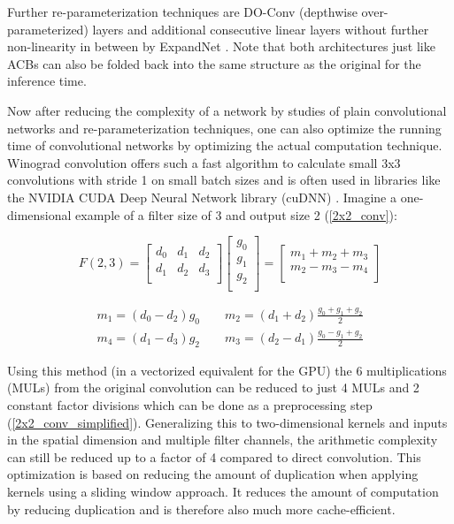 Further re-parameterization techniques are DO-Conv (depthwise over-parameterized) layers \cite{JinmingCao.2020} and additional consecutive linear layers without further non-linearity in between by ExpandNet \cite{ShuxuanGuo.2021}. Note that both architectures just like ACBs can also be folded back into the same structure as the original for the inference time. 

Now after reducing the complexity of a network by studies of plain convolutional networks and re-parameterization techniques, one can also optimize the running time of convolutional networks by optimizing the actual computation technique. Winograd convolution offers such a fast algorithm to calculate small 3x3 convolutions with stride 1 on small batch sizes and is often used in libraries like the NVIDIA CUDA Deep Neural Network library (cuDNN) \cite{SharanChetlur.2014}. Imagine a one-dimensional example of a filter size of 3 and output size 2 (\autoref{2x2_conv}):

\begin{equation} \label{2x2_conv}
	F(2,3) = \begin{bmatrix}
		d_0 & d_1 & d_2 \\
		d_1 & d_2 & d_3 \\
	\end{bmatrix} \begin{bmatrix}
		g_0 \\
		g_1 \\
		g_2 \\
	\end{bmatrix} = \begin{bmatrix}
		m_1 + m_2 + m_3 \\
		m_2 - m_3 - m_4 \\
	\end{bmatrix}
\end{equation}

\begin{equation} \label{2x2_conv_simplified}
	\begin{array}{c}
		m_1 = (d_0 - d_2) g_0 \qquad m_2 = (d_1 + d_2) \frac{g_0 + g_1 + g_2}{2} \\[6pt]
		m_4 = (d_1 - d_3) g_2 \qquad m_3 = (d_2 - d_1) \frac{g_0 - g_1 + g_2}{2}
	\end{array}
\end{equation}

Using this method (in a vectorized equivalent for the GPU) the 6 multiplications (MULs) from the original convolution can be reduced to just 4 MULs and 2 constant factor divisions which can be done as a preprocessing step (\autoref{2x2_conv_simplified}). Generalizing this to two-dimensional kernels and inputs in the spatial dimension and multiple filter channels, the arithmetic complexity can still be reduced up to a factor of 4 compared to direct convolution. This optimization is based on reducing the amount of duplication when applying kernels using a sliding window approach. It reduces the amount of computation by reducing duplication and is therefore also much more cache-efficient. \cite{AndrewLavin.2015}